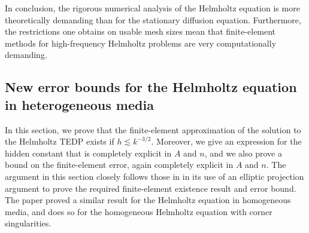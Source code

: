 In conclusion, the rigorous numerical analysis of the Helmholtz equation is more theoretically demanding than for the stationary diffusion equation. Furthermore, the restrictions one obtains on usable mesh sizes mean that finite-element methods for high-frequency Helmholtz problems are very computationally demanding.






\subsection{New error bounds for the Helmholtz equation in heterogeneous media}\label{sec:heterr}
In this section, we prove that the finite-element approximation of the solution to the Helmholtz TEDP exists if $ h \lesssim k^{-3/2}.$ Moreover, we give an expression for the hidden constant that is completely explicit in $A$ and $n$, and we also prove a bound on the finite-element error, again completely explicit in $A$ and $n$. The argument in this section closely follows those in \cite{FeWu:11,ChNi:18} in its use of an elliptic projection argument to prove the required finite-element existence result and error bound. The paper \cite{FeWu:11} proved a similar result for the Helmholtz equation in homogeneous media, and \cite{ChNi:18} does so for the homogeneous Helmholtz equation with corner singularities.

